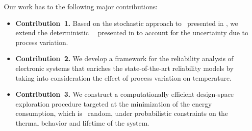 Our work has to the following major contributions:
\begin{itemize}
  \item {\bfseries Contribution~1.} Based on the stochastic approach to \tta\ presented in \cite{ukhov2014}, we extend the deterministic \DSS\ \ta\ presented in \cite{ukhov2012} to account for the uncertainty due to process variation.
  \item {\bfseries Contribution~2.} We develop a framework for the reliability analysis of electronic systems that enriches the state-of-the-art reliability models by taking into consideration the effect of process variation on temperature.
  \item {\bfseries Contribution~3.} We construct a computationally efficient design-space exploration procedure targeted at the minimization of the energy consumption, which is \apriori\ random, under probabilistic constraints on the thermal behavior and lifetime of the system.
\end{itemize}
